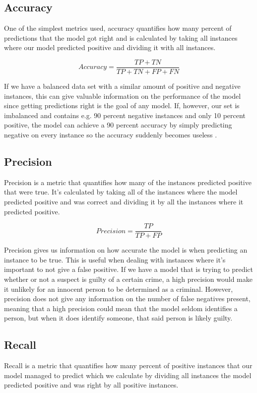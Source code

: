 \documentclass[nofilelist]{cslthse-msc}
\begin{document}






\subsection{Accuracy}
One of the simplest metrics used, accuracy quantifies how many percent of predictions that the model got right and is calculated by taking all instances where our model predicted positive and dividing it with all instances.

$$ Accuracy = \frac{TP + TN}{TP + TN + FP + FN}$$

If we have a balanced data set with a similar amount of positive and negative instances, this can give valuable information on the performance of the model since getting predictions right is the goal of any model. If, however, our set is imbalanced and contains e.g. 90 percent negative instances and only 10 percent positive, the model can achieve a 90 percent accuracy by simply predicting negative on every instance so the accuracy suddenly becomes useless \citep{imbalancedlearning}. 

\subsection{Precision}
Precision is a metric that quantifies how many of the instances predicted positive that were true. It's calculated by taking all of the instances where the model predicted positive and was correct and dividing it by all the instances where it predicted positive.

$$ Precision = \frac{TP}{TP + FP}$$

Precision gives us information on how accurate the model is when predicting an instance to be true. This is useful when dealing with instances where it's important to not give a false positive. If we have a model that is trying to predict whether or not a suspect is guilty of a certain crime, a high precision would make it unlikely for an innocent person to be determined as a criminal. 
However, precision does not give any information on the number of false negatives present, meaning that a high precision could mean that the model seldom identifies a person, but when it does identify someone, that said person is likely guilty.

\subsection{Recall}
Recall is a metric that quantifies how many percent of positive instances that our model managed to predict which we calculate by dividing all instances the model predicted positive and was right by all positive instances.
\end{document}
